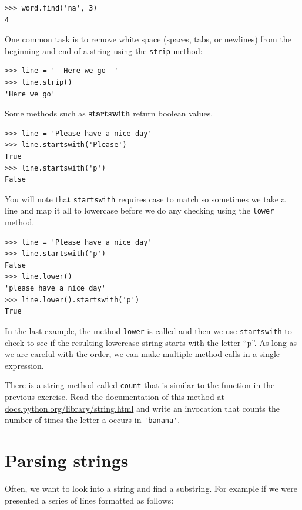 \documentclass[10pt]{book}
\begin{document}

\beforeverb
\begin{verbatim}
>>> word.find('na', 3)
4
\end{verbatim}
\afterverb
%
One common task is to remove white space (spaces, tabs, or newlines) from
the beginning and end of a string using the {\tt strip} method:

\beforeverb
\begin{verbatim}
>>> line = '  Here we go  '
>>> line.strip()
'Here we go'
\end{verbatim}
\afterverb
%
Some methods such as {\bf startswith} return boolean values.

\beforeverb
\begin{verbatim}
>>> line = 'Please have a nice day'
>>> line.startswith('Please')
True
>>> line.startswith('p')
False
\end{verbatim}
\afterverb
%
You will note that {\tt startswith} requires case to match so sometimes
we take a line and map it all to lowercase before we do any checking
using the {\tt lower} method.

\beforeverb
\begin{verbatim}
>>> line = 'Please have a nice day'
>>> line.startswith('p')
False
>>> line.lower()
'please have a nice day'
>>> line.lower().startswith('p')
True
\end{verbatim}
\afterverb
%
In the last example, the method {\tt lower} is called
and then we use {\tt startswith}
to check to see if the resulting lowercase string
starts with the letter ``p''.  As long as we are careful
with the order, we can make multiple method calls in a
single expression.

\begin{ex}

There is a string method called {\tt count} that is similar
to the function in the previous exercise.  Read the documentation
of this method at
\url{docs.python.org/library/string.html}
and write an invocation that counts the number of times the 
letter a  occurs
in \verb"'banana'".
\end{ex}

\section{Parsing strings}

Often, we want to look into a string and find a substring.  For example
if we were presented a series of lines formatted as follows:
\end{document}
